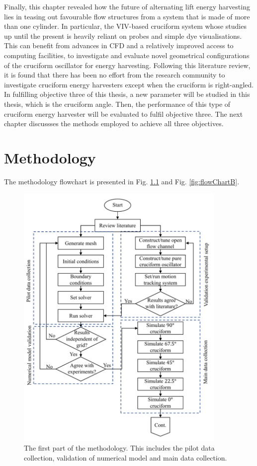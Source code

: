 \documentclass[oneside]{utmthesis}
\begin{document}
Finally, this chapter revealed how the future of alternating lift energy harvesting lies in teasing out favourable flow structures from a system that is made of more than one cylinder. In particular, the VIV-based cruciform system whose studies up until the present is heavily reliant on probes and simple dye visualisations. This can benefit from advances in CFD and a relatively improved access to computing facilities, to investigate and evaluate novel geometrical configurations of the cruciform oscillator for energy harvesting. Following this literature review, it is found that there has been no effort from the research community to investigate cruciform energy harvesters except when the cruciform is right-angled. In fulfilling objective three of this thesis, a new parameter will be studied in this thesis, which is the cruciform angle. Then, the performance of this type of cruciform energy harvester will be evaluated to fulfil objective three.
The next chapter discussses the methods employed to achieve all three objectives.

\chapter{Methodology} \label{chap:method}

The methodology flowchart is presented in Fig. \ref{fig:flowChartA} and Fig. \ref{fig:flowChartB}.

\begin{figure}[!h]
  \centering
  \hspace{1cm} \includegraphics[width=0.9\textwidth]{figs/flowChartA}
  \caption{The first part of the methodology. This includes the pilot data collection, validation of numerical model and main data collection.}
  \label{fig:flowChartA}
\end{figure}
\end{document}
